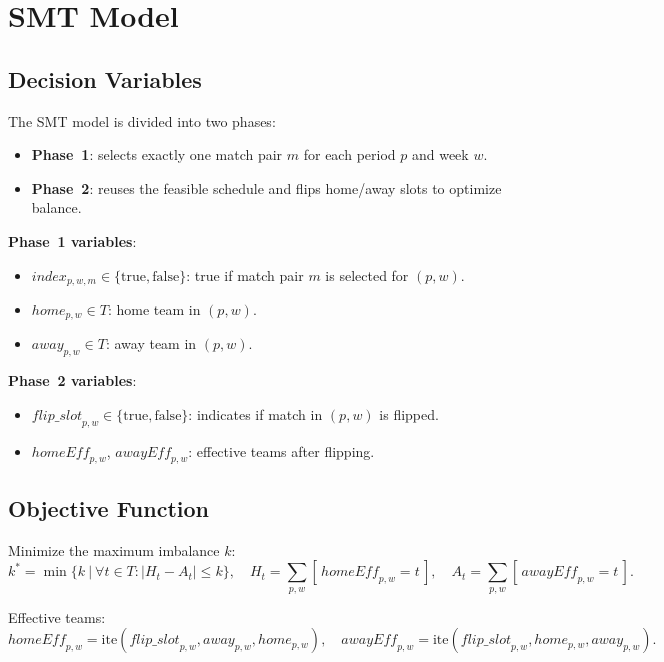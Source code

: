 \section{SMT Model}

\subsection{Decision Variables}

The SMT model is divided into two phases:

\begin{itemize}
    \item \textbf{Phase~1}: selects exactly one match pair $m$ for each period $p$ and week $w$.
    \item \textbf{Phase~2}: reuses the feasible schedule and flips home/away slots to optimize balance.
\end{itemize}

\textbf{Phase~1 variables}:
\begin{itemize}
    \item $\mathit{index}_{p,w,m} \in \{\text{true}, \text{false}\}$: true if match pair $m$ is selected for $(p,w)$.
    \item $\mathit{home}_{p,w} \in T$: home team in $(p,w)$.
    \item $\mathit{away}_{p,w} \in T$: away team in $(p,w)$.
\end{itemize}

\textbf{Phase~2 variables}:
\begin{itemize}
    \item $\mathit{flip\_slot}_{p,w} \in \{\text{true}, \text{false}\}$: indicates if match in $(p,w)$ is flipped.
    \item $\mathit{homeEff}_{p,w}$, $\mathit{awayEff}_{p,w}$: effective teams after flipping.
\end{itemize}

\subsection{Objective Function}

Minimize the maximum imbalance $k$:
\[
k^* = \min \Big\{ k ~|~ \forall t \in T: |H_t - A_t| \leq k \Big\},
\quad 
H_t = \sum_{p,w} [\, \mathit{homeEff}_{p,w} = t\,], \quad 
A_t = \sum_{p,w} [\, \mathit{awayEff}_{p,w} = t\,].
\]

Effective teams:
\[
\mathit{homeEff}_{p,w} = \text{ite}(\mathit{flip\_slot}_{p,w}, \mathit{away}_{p,w}, \mathit{home}_{p,w}), 
\quad
\mathit{awayEff}_{p,w} = \text{ite}(\mathit{flip\_slot}_{p,w}, \mathit{home}_{p,w}, \mathit{away}_{p,w}).
\]

